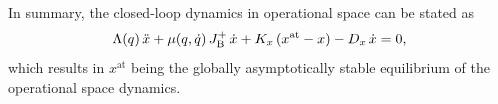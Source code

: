 
In summary, the closed-loop dynamics in operational space can be stated as
\begin{equation}\label{eq:braincontrol:closed_loop_dynamics}
    \Lambda(q) \, \Ddot{x} + \mu(q,\dot{q}) \, J_\mathrm{B}^+ \, \dot{x} + K_x \, (x^\mathrm{at} - x) - D_x \, \dot{x} = 0,
\end{equation}
which results in $x^\mathrm{at}$ being the globally asymptotically stable equilibrium of the operational space dynamics.


